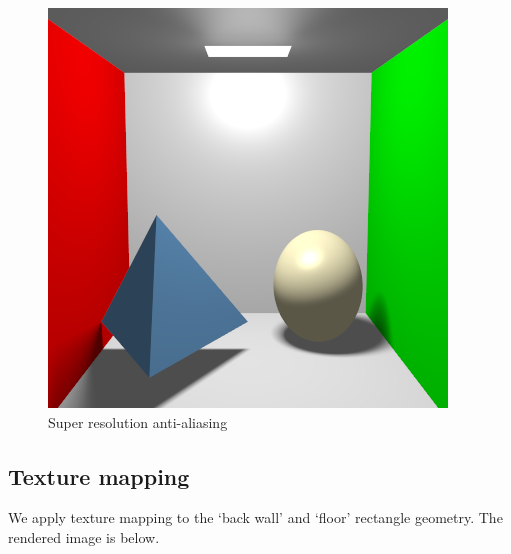 \documentclass[acmtog]{acmart}
\begin{document}
\begin{figure}[h]
{\begin{minipage}[b]{0.8\linewidth}
			\includegraphics[width=\textwidth]{images/result-antialiasing-4x4.png}
		\end{minipage}
	}
	\caption{Super resolution anti-aliasing}
\end{figure}

\newpage

\subsection{Texture mapping}

We apply texture mapping to the `back wall' and `floor' rectangle geometry. The rendered image is below.
\end{document}
